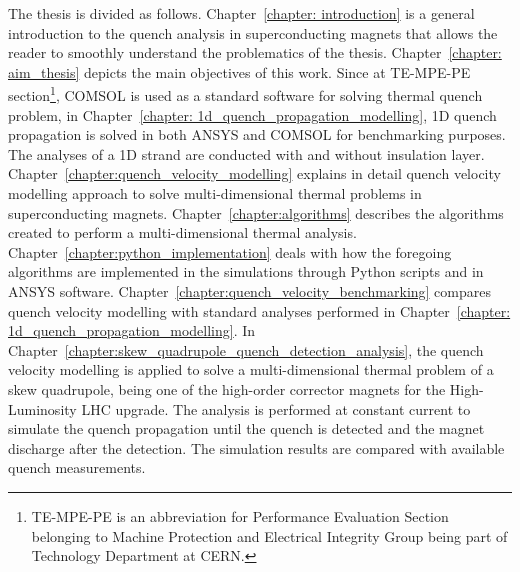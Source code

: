 
The thesis is divided as follows. Chapter~\ref{chapter: introduction} is a general introduction to the quench analysis in superconducting magnets that allows the reader to smoothly understand the problematics of the thesis. Chapter~\ref{chapter: aim_thesis} depicts the main objectives of this work. Since at TE-MPE-PE section\footnote{TE-MPE-PE is an abbreviation for Performance Evaluation Section belonging to Machine Protection and Electrical Integrity Group being part of Technology Department at CERN.}, COMSOL is used as a standard software for solving thermal quench problem, in Chapter~\ref{chapter: 1d_quench_propagation_modelling}, 1D quench propagation is solved in both ANSYS and COMSOL for benchmarking purposes. The analyses of a 1D strand are conducted with and without insulation layer. Chapter~\ref{chapter:quench_velocity_modelling} explains in detail quench velocity modelling approach to solve multi-dimensional thermal problems in superconducting magnets.
Chapter~\ref{chapter:algorithms} describes the algorithms created to perform a multi-dimensional thermal analysis. Chapter~\ref{chapter:python_implementation} deals with how the foregoing algorithms are implemented in the simulations through Python scripts and in ANSYS software. Chapter~\ref{chapter:quench_velocity_benchmarking} compares quench velocity modelling with standard analyses performed in Chapter~\ref{chapter: 1d_quench_propagation_modelling}. In Chapter~\ref{chapter:skew_quadrupole_quench_detection_analysis}, the quench velocity modelling is applied to solve a multi-dimensional thermal problem of a skew quadrupole, being one of the high-order corrector magnets for the High-Luminosity LHC upgrade. The analysis is performed at constant current to simulate the quench propagation until the quench is detected and the magnet discharge after the detection. The simulation results are compared with available quench measurements.

